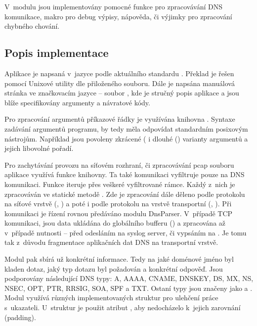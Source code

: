 \documentclass[11pt, a4paper, titlepage]{article}
\begin{document}
V~modulu  jsou implementovány pomocné funkce pro zpracovávání DNS komunikace, makro pro debug výpisy, nápověda, či výjimky pro zpracování chybného chování.
\bigskip



\subsection{Popis implementace}

Aplikace je napsaná v~jazyce  podle aktuálního standardu . Překlad je řešen pomocí Unixové utility  dle přiloženého  souboru. Dále je napsána manuálová stránka ve značkovacím jazyce  -- soubor , kde je stručný popis aplikace a jsou blíže specifikovány argumenty a návratové kódy.
\bigskip

Pro zpracování argumentů příkazové řádky je využívána knihovna . Syntaxe zadávání argumentů programu, by tedy měla odpovídat standardním posixovým nástrojům. Například jsou povoleny zkrácené ( i dlouhé () varianty argumentů a jejich libovolné pořadí.
\bigskip

Pro zachytávání provozu na síťovém rozhraní, či zpracovávání pcap souboru aplikace využívá funkce  knihovny. Ta také komunikaci vyfiltruje pouze na DNS komunikaci. Funkce  iteruje přes veškeré vyfiltrované rámce. Každý z~nich je zpracováván ve statické metodě . Zde je zpracování dále děleno podle protokolu na síťové vrstvě (, ) a poté i podle protokolu na vrstvě transportní (, ). Při  komunikaci je řízení rovnou předáváno modulu DnsParser. V~případě TCP komunikaci, jsou data ukládána do globálního bufferu () a zpracována až v~případě nutnosti -- před odesláním na syslog server, či vypsáním na . Je tomu tak z~důvodu fragmentace aplikačních dat DNS na transportní vrstvě.
\bigskip

Modul  pak sbírá už konkrétní informace. Tedy na jaké doménové jméno byl kladen dotaz, jaký typ dotazu byl požadován a konkrétní odpověď. Jsou podporovány následující DNS typy: A, AAAA, CNAME, DNSKEY, DS, MX, NS, NSEC, OPT, PTR, RRSIG, SOA, SPF a TXT. Ostaní typy jsou značeny jako  a . Modul využívá různých implementovaných struktur pro ulehčení práce s~ukazateli. U~struktur je použit atribut , aby nedocházelo k~jejich zarovnání (padding).
\bigskip
\end{document}
